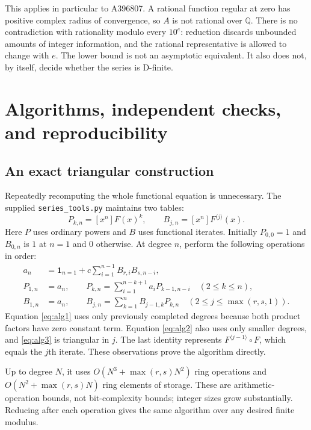 \documentclass[11pt,letterpaper]{article}
\theoremstyle{definition}
\theoremstyle{remark}
\newcommand{\Q}{\mathbb Q}
\newcommand{\iter}[2]{#1^{\langle #2\rangle}}
\newcommand{\coeff}[1]{[x^{#1}]}
\begin{document}
This applies in particular to A396807.  A rational function regular at
zero has positive complex radius of convergence, so $A$ is not rational
over $\Q$.  There is no contradiction with rationality modulo every
$10^e$: reduction discards unbounded amounts of integer information,
and the rational representative is allowed to change with $e$.
The lower bound is not an asymptotic equivalent.  It also does not,
by itself, decide whether the series is D-finite.

\section{Algorithms, independent checks, and reproducibility}\label{sec:computation}

\subsection{An exact triangular construction}
Repeatedly recomputing the whole functional equation is unnecessary.
The supplied \texttt{series\_tools.py} maintains two tables:
\[
 P_{k,n}=\coeff{n}F(x)^k,
 \qquad B_{j,n}=\coeff{n}\iter{F}{j}(x).
\]
Here $P$ uses ordinary powers and $B$ uses functional iterates.
Initially $P_{0,0}=1$ and $B_{0,n}$ is $1$ at $n=1$ and $0$ otherwise.
At degree $n$, perform the following operations in order:
\begin{align}
 a_n&=\mathbf1_{n=1}
       +c\sum_{i=1}^{n-1}B_{r,i}B_{s,n-i},\label{eq:alg1}\\
 P_{1,n}&=a_n,\qquad
 P_{k,n}=\sum_{i=1}^{n-k+1}a_iP_{k-1,n-i}\quad(2\leq k\leq n),
                                                        \label{eq:alg2}\\
 B_{1,n}&=a_n,\qquad
 B_{j,n}=\sum_{k=1}^{n}B_{j-1,k}P_{k,n}
                    \quad(2\leq j\leq\max(r,s,1)).       \label{eq:alg3}
\end{align}
Equation \eqref{eq:alg1} uses only previously completed degrees because
both product factors have zero constant term.
Equation \eqref{eq:alg2} also uses only smaller degrees, and
\eqref{eq:alg3} is triangular in $j$.
The last identity represents $\iter{F}{j-1}\circ F$, which equals the
$j$th iterate.  These observations prove the algorithm directly.

Up to degree $N$, it uses
$O(N^3+\max(r,s)N^2)$ ring operations and
$O(N^2+\max(r,s)N)$ ring elements of storage.
These are arithmetic-operation bounds, not bit-complexity bounds;
integer sizes grow substantially.  Reducing after each operation gives
the same algorithm over any desired finite modulus.
\end{document}
